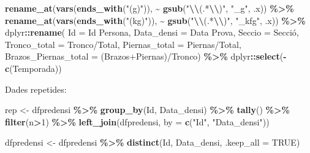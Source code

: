 \documentclass[
]{book}
\newenvironment{Shaded}{\begin{snugshade}}{\end{snugshade}}
\newcommand{\AttributeTok}[1]{\textcolor[rgb]{0.13,0.29,0.53}{#1}}
\newcommand{\ConstantTok}[1]{\textcolor[rgb]{0.56,0.35,0.01}{#1}}
\newcommand{\DecValTok}[1]{\textcolor[rgb]{0.00,0.00,0.81}{#1}}
\newcommand{\FunctionTok}[1]{\textcolor[rgb]{0.13,0.29,0.53}{\textbf{#1}}}
\newcommand{\NormalTok}[1]{#1}
\newcommand{\OtherTok}[1]{\textcolor[rgb]{0.56,0.35,0.01}{#1}}
\newcommand{\SpecialCharTok}[1]{\textcolor[rgb]{0.81,0.36,0.00}{\textbf{#1}}}
\newcommand{\StringTok}[1]{\textcolor[rgb]{0.31,0.60,0.02}{#1}}
\theoremstyle{definition}
\theoremstyle{definition}
\theoremstyle{definition}
\theoremstyle{definition}
\theoremstyle{remark}
\begin{document}
\begin{Shaded}
\begin{Highlighting}[]
  \FunctionTok{rename\_at}\NormalTok{(}\FunctionTok{vars}\NormalTok{(}\FunctionTok{ends\_with}\NormalTok{(}\StringTok{"(g)"}\NormalTok{)), }\SpecialCharTok{\textasciitilde{}} \FunctionTok{gsub}\NormalTok{(}\StringTok{"}\SpecialCharTok{\textbackslash{}\textbackslash{}}\StringTok{(.*}\SpecialCharTok{\textbackslash{}\textbackslash{}}\StringTok{)"}\NormalTok{, }\StringTok{"\_g"}\NormalTok{, .x)) }\SpecialCharTok{\%\textgreater{}\%}
  \FunctionTok{rename\_at}\NormalTok{(}\FunctionTok{vars}\NormalTok{(}\FunctionTok{ends\_with}\NormalTok{(}\StringTok{"(kg)"}\NormalTok{)), }\SpecialCharTok{\textasciitilde{}} \FunctionTok{gsub}\NormalTok{(}\StringTok{"}\SpecialCharTok{\textbackslash{}\textbackslash{}}\StringTok{(.*}\SpecialCharTok{\textbackslash{}\textbackslash{}}\StringTok{)"}\NormalTok{, }\StringTok{"\_kfg"}\NormalTok{, .x)) }\SpecialCharTok{\%\textgreater{}\%} 
\NormalTok{    dplyr}\SpecialCharTok{::}\FunctionTok{rename}\NormalTok{(}
    \AttributeTok{Id =} \StringTok{\textasciigrave{}}\AttributeTok{Id Persona}\StringTok{\textasciigrave{}}\NormalTok{,}
    \AttributeTok{Data\_densi =} \StringTok{\textasciigrave{}}\AttributeTok{Data Prova}\StringTok{\textasciigrave{}}\NormalTok{,}
    \AttributeTok{Seccio =} \StringTok{\textasciigrave{}}\AttributeTok{Secció}\StringTok{\textasciigrave{}}\NormalTok{,}
    \AttributeTok{Tronco\_total =} \StringTok{\textasciigrave{}}\AttributeTok{Tronco/Total}\StringTok{\textasciigrave{}}\NormalTok{,}
    \AttributeTok{Piernas\_total =} \StringTok{\textasciigrave{}}\AttributeTok{Piernas/Total}\StringTok{\textasciigrave{}}\NormalTok{,}
    \AttributeTok{Brazos\_Piernas\_total =} \StringTok{\textasciigrave{}}\AttributeTok{(Brazos+Piernas)/Tronco}\StringTok{\textasciigrave{}}\NormalTok{) }\SpecialCharTok{\%\textgreater{}\%} 
\NormalTok{  dplyr}\SpecialCharTok{::}\FunctionTok{select}\NormalTok{(}\SpecialCharTok{{-}}\FunctionTok{c}\NormalTok{(Temporada))}
\end{Highlighting}
\end{Shaded}

Dades repetides:

\begin{Shaded}
\begin{Highlighting}[]
\NormalTok{rep }\OtherTok{\textless{}{-}}\NormalTok{ dfpredensi }\SpecialCharTok{\%\textgreater{}\%}
  \FunctionTok{group\_by}\NormalTok{(Id, Data\_densi) }\SpecialCharTok{\%\textgreater{}\%} 
  \FunctionTok{tally}\NormalTok{() }\SpecialCharTok{\%\textgreater{}\%} 
  \FunctionTok{filter}\NormalTok{(n}\SpecialCharTok{\textgreater{}}\DecValTok{1}\NormalTok{) }\SpecialCharTok{\%\textgreater{}\%} 
  \FunctionTok{left\_join}\NormalTok{(dfpredensi, }\AttributeTok{by =} \FunctionTok{c}\NormalTok{(}\StringTok{"Id"}\NormalTok{, }\StringTok{"Data\_densi"}\NormalTok{))}

\NormalTok{dfpredensi }\OtherTok{\textless{}{-}}\NormalTok{ dfpredensi }\SpecialCharTok{\%\textgreater{}\%} \FunctionTok{distinct}\NormalTok{(Id, Data\_densi, }\AttributeTok{.keep\_all =} \ConstantTok{TRUE}\NormalTok{)}
\end{Highlighting}
\end{Shaded}
\end{document}

